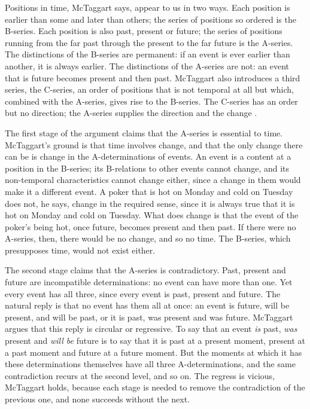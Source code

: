 \documentclass{situationist-preprint}
\begin{document}
Positions in time, McTaggart says, appear to us in two ways. Each position is earlier than some and later than others; the series of positions so ordered is the B-series. Each position is also past, present or future; the series of positions running from the far past through the present to the far future is the A-series. The distinctions of the B-series are permanent: if an event is ever earlier than another, it is always earlier. The distinctions of the A-series are not: an event that is future becomes present and then past. McTaggart also introduces a third series, the C-series, an order of positions that is not temporal at all but which, combined with the A-series, gives rise to the B-series. The C-series has an order but no direction; the A-series supplies the direction and the change \citep[ch.~33]{McTaggart1927}.

The first stage of the argument claims that the A-series is essential to time. McTaggart's ground is that time involves change, and that the only change there can be is change in the A-determinations of events. An event is a content at a position in the B-series; its B-relations to other events cannot change, and its non-temporal characteristics cannot change either, since a change in them would make it a different event. A poker that is hot on Monday and cold on Tuesday does not, he says, change in the required sense, since it is always true that it is hot on Monday and cold on Tuesday. What does change is that the event of the poker's being hot, once future, becomes present and then past. If there were no A-series, then, there would be no change, and so no time. The B-series, which presupposes time, would not exist either.

The second stage claims that the A-series is contradictory. Past, present and future are incompatible determinations: no event can have more than one. Yet every event has all three, since every event is past, present and future. The natural reply is that no event has them all at once: an event is future, will be present, and will be past, or it is past, was present and was future. McTaggart argues that this reply is circular or regressive. To say that an event \emph{is} past, \emph{was} present and \emph{will be} future is to say that it is past at a present moment, present at a past moment and future at a future moment. But the moments at which it has these determinations themselves have all three A-determinations, and the same contradiction recurs at the second level, and so on. The regress is vicious, McTaggart holds, because each stage is needed to remove the contradiction of the previous one, and none succeeds without the next.
\end{document}
